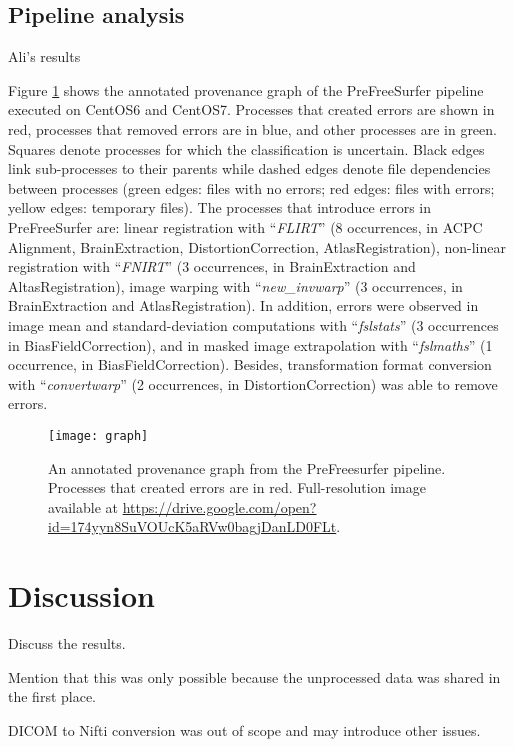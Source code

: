 \documentclass{article}
\begin{document}
\subsection{Pipeline analysis}

Ali's results

Figure \ref{fig:2} shows the annotated provenance graph of the
PreFreeSurfer pipeline executed on CentOS6 and CentOS7.  Processes
that created errors are shown in red, processes that removed errors
are in blue, and other processes are in green.  Squares denote
processes for which the classification is uncertain. Black edges link
sub-processes to their parents while dashed edges denote file
dependencies between processes (green edges: files with no errors; red
edges: files with errors; yellow edges: temporary files).  The
processes that introduce errors in PreFreeSurfer are: linear
registration with “\emph{FLIRT}” (8 occurrences, in ACPC Alignment,
BrainExtraction, DistortionCorrection, AtlasRegistration), non-linear
registration with “\emph{FNIRT}” (3 occurrences, in BrainExtraction
and AltasRegistration), image warping with “\emph{new\_invwarp}” (3
occurrences, in BrainExtraction and AtlasRegistration).  In addition,
errors were observed in image mean and standard-deviation computations
with “\emph{fslstats}” (3 occurrences in BiasFieldCorrection), and in
masked image extrapolation with “\emph{fslmaths}” (1 occurrence, in
BiasFieldCorrection).  Besides, transformation format conversion with
“\emph{convertwarp}” (2 occurrences, in DistortionCorrection) was able
to remove errors.

\begin{figure}
  \texttt{[image: graph]}
  \caption{An annotated provenance graph from the PreFreesurfer pipeline. Processes that created errors are in red. 
Full-resolution image available at \url{https://drive.google.com/open?id=174yyn8SuVOUcK5aRVw0bagjDanLD0FLt}.}
  \label{fig:2}
\end{figure}

\section{Discussion}

Discuss the results.

Mention that this was only possible because the unprocessed data was shared in the first place.

DICOM to Nifti conversion was out of scope and may introduce other issues.
\end{document}
